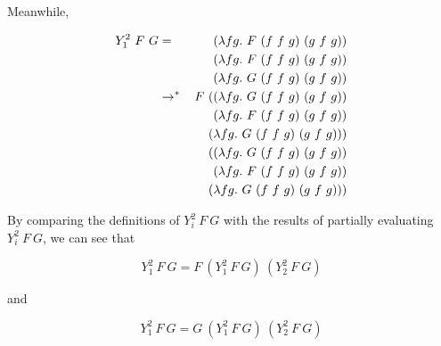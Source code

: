 \documentclass[10pt]{article}
\newcommand{\stepsTo}{\rightarrow}
\newcommand{\multiStepsTo}{\stepsTo^*}
\begin{document}
Meanwhile,

\begin{eqnarray*}
    Y^2_1~F~G & =             & (\lambda f g .~F~(f~f~g)~(g~f~g)) \\
              &               & (\lambda f g .~F~(f~f~g)~(g~f~g)) \\
              &               & (\lambda f g .~G~(f~f~g)~(g~f~g)) \\
              & \multiStepsTo & F~((\lambda f g .~G~(f~f~g)~(g~f~g)) \\
              &               & \hspace{.45cm}(\lambda f g .~F~(f~f~g)~(g~f~g)) \\
              &               & \hspace{.45cm}(\lambda f g .~G~(f~f~g)~(g~f~g))) \\
              &               & \hspace{.35cm}((\lambda f g .~G~(f~f~g)~(g~f~g)) \\
              &               & \hspace{.45cm}(\lambda f g .~F~(f~f~g)~(g~f~g)) \\
              &               & \hspace{.45cm}(\lambda f g .~G~(f~f~g)~(g~f~g)))
\end{eqnarray*}

By comparing the definitions of $Y^2_i~F~G$ with the results of partially
evaluating $Y^2_i~F~G$, we can see that

$$Y^2_1~F~G = F~(Y^2_1~F~G)~(Y^2_2~F~G) $$

and

$$Y^2_1~F~G = G~(Y^2_1~F~G)~(Y^2_2~F~G) $$
\end{document}
